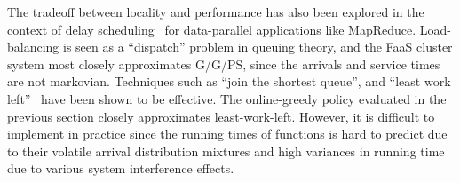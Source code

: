 The tradeoff between locality and performance has also been explored in the context of delay scheduling~\cite{zaharia2010delay} for data-parallel applications like MapReduce.
Load-balancing is seen as a ``dispatch'' problem in queuing theory, and the FaaS cluster system most closely approximates G/G/PS, since the arrivals and service times are not markovian.
Techniques such as ``join the shortest queue'', and ``least work left''~\cite{gupta2007analysis} have been shown to be effective.
The online-greedy policy evaluated in the previous section closely approximates least-work-left.
However, it is difficult to implement in practice since the running times of functions is hard to predict due to their volatile arrival distribution mixtures and high variances in running time due to various system interference effects.




